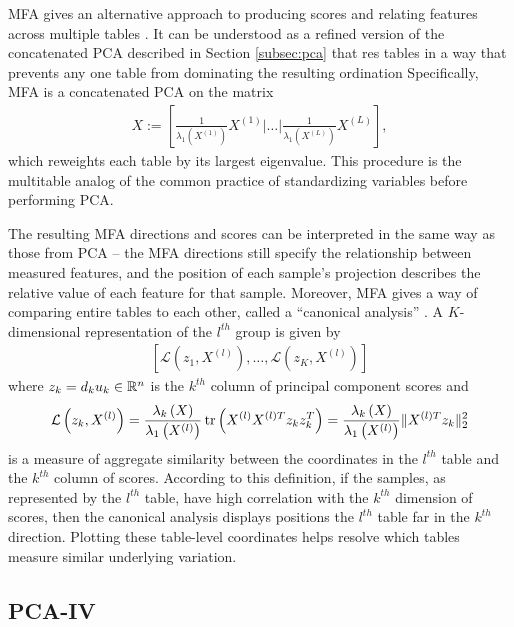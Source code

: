 \documentclass[14pt]{extarticle}
\begin{document}
MFA gives an alternative approach to producing scores and relating features
across multiple tables \citep{pages2014multiple}. It can be understood as a
refined version of the concatenated PCA described in Section \ref{subsec:pca}
that res tables in a way that prevents any one table from dominating the
resulting ordination Specifically, MFA is a concatenated PCA on the matrix
\begin{align*}
X := \left[\frac{1}{\lambda_{1}\left(X^{(1)}\right)}X^{(1)} \vert \dots
  \vert \frac{1}{\lambda_{1}\left(X^{(L)}\right)}X^{(L)}\right],
\end{align*}
which reweights each table by its largest eigenvalue. This procedure is the
multitable analog of the common practice of standardizing variables before
performing PCA.

The resulting MFA directions and scores can be interpreted in the same
way as those from PCA -- the MFA directions still specify the
relationship between measured features, and the position of each
sample's projection describes the relative value of each feature for
that sample. Moreover, MFA gives a way of comparing entire tables to
each other, called a ``canonical analysis'' \citep{pages2004multiple}. A
$K$-dimensional representation of the $l^{th}$ group is given by
\begin{align*}
\left[\mathcal{L}\left(z_{1}, X^{(l)}\right), \dots,
  \mathcal{L}\left(z_{K}, X^{(l)}\right)\right]
\end{align*}
where $z_{k} = d_{k}u_{k} \in \mathbb{R}^{n}$ is the $k^{th}$ column of principal
component scores and
\begin{align*}
  \mathcal{L}\left(z_{k}, X^{(l)}\right) =
  \frac{\lambda_{k}\left(X\right)}{\lambda_{1}\left(X^{(l)}\right)}\mathop\mathrm{tr}\left(X^{(l)}X^{(l)
      T} z_{k}z_{k}^{T}\right) =
  \frac{\lambda_{k}\left(X\right)}{\lambda_{1}\left(X^{(l)}\right)}\|X^{(l)
  T} z_{k}\|^{2}_{2}
\end{align*}
is a measure of aggregate similarity between the coordinates in the $l^{th}$
table and the $k^{th}$ column of scores. According to this definition, if the
samples, as represented by the $l^{th}$ table, have high correlation with the
$k^{th}$ dimension of scores, then the canonical analysis displays positions the
$l^{th}$ table far in the $k^{th}$ direction. Plotting these table-level
coordinates helps resolve which tables measure similar underlying variation.

\subsection{PCA-IV}
\end{document}
